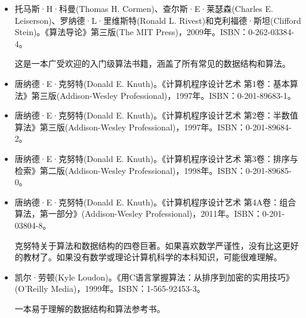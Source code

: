 \begin{itemize}
\item
托马斯·H·科曼(Thomas H. Cormen)、查尔斯·E·莱瑟森(Charles E. Leiserson)、罗纳德·L·里维斯特(Ronald L. Rivest)和克利福德·斯坦(Clifford Stein)。《算法导论》第三版(The MIT Press)，2009年。ISBN：0-262-03384-4。

\hspace*{\fill}

这是一本广受欢迎的入门级算法书籍，涵盖了所有常见的数据结构和算法。

\hspace*{\fill}

\item
唐纳德·E·克努特(Donald E. Knuth)。《计算机程序设计艺术 第1卷：基本算法》第三版(Addison-Wesley Professional)，1997年。ISBN：0-201-89683-1。

\item
唐纳德·E·克努特(Donald E. Knuth)。《计算机程序设计艺术 第2卷：半数值算法》第三版(Addison-Wesley Professional)，1997年。ISBN：0-201-89684-2。

\item
唐纳德·E·克努特(Donald E. Knuth)。《计算机程序设计艺术 第3卷：排序与检索》第二版(Addison-Wesley Professional)，1998年。ISBN：0-201-89685-0。

\item
唐纳德·E·克努特(Donald E. Knuth)。《计算机程序设计艺术 第4A卷：组合算法，第一部分》(Addison-Wesley Professional)，2011年。ISBN：0-201-03804-8。

\hspace*{\fill}

克努特关于算法和数据结构的四卷巨著。如果喜欢数学严谨性，没有比这更好的教材了。如果没有数学或理论计算机科学的本科知识，可能很难理解。

\hspace*{\fill}

\item
凯尔·劳顿(Kyle Loudon)。《用C语言掌握算法：从排序到加密的实用技巧》(O'Reilly Media)，1999年。ISBN：1-565-92453-3。

\hspace*{\fill}

一本易于理解的数据结构和算法参考书。
\end{itemize}